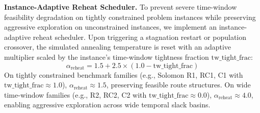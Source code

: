 \documentclass[conference]{IEEEtran}
\begin{document}
\textbf{Instance-Adaptive Reheat Scheduler.}
To prevent severe time-window feasibility degradation on tightly constrained problem instances while preserving aggressive exploration on unconstrained instances, we implement an instance-adaptive reheat scheduler. Upon triggering a stagnation restart or population crossover, the simulated annealing temperature is reset with an adaptive multiplier scaled by the instance's time-window tightness fraction $\text{tw\_tight\_frac}$:
\begin{equation}
  \alpha_{\text{reheat}} = 1.5 + 2.5 \times (1.0 - \text{tw\_tight\_frac})
  \label{eq:reheat_mult}
\end{equation}
On tightly constrained benchmark families (e.g., Solomon R1, RC1, C1 with $\text{tw\_tight\_frac} \approx 1.0$), $\alpha_{\text{reheat}} \approx 1.5$, preserving feasible route structures. On wide time-window families (e.g., R2, RC2, C2 with $\text{tw\_tight\_frac} \approx 0.0$), $\alpha_{\text{reheat}} \approx 4.0$, enabling aggressive exploration across wide temporal slack basins.
\end{document}
